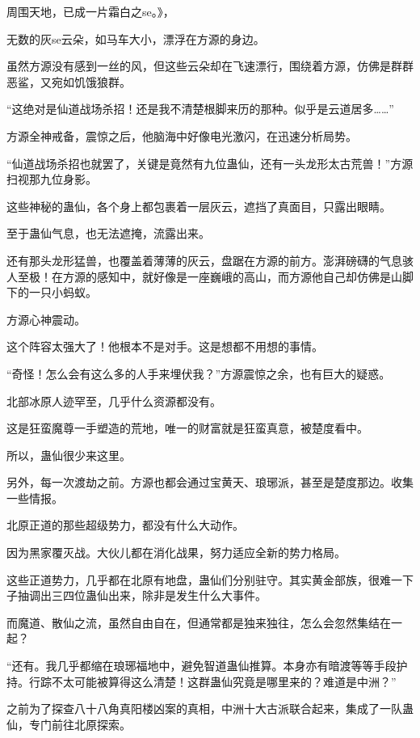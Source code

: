 
\begin{this_body}

周围天地，已成一片霜白之se。》，

无数的灰se云朵，如马车大小，漂浮在方源的身边。

虽然方源没有感到一丝的风，但这些云朵却在飞速漂行，围绕着方源，仿佛是群群恶鲨，又宛如饥饿狼群。

“这绝对是仙道战场杀招！还是我不清楚根脚来历的那种。似乎是云道居多……”

方源全神戒备，震惊之后，他脑海中好像电光激闪，在迅速分析局势。

“仙道战场杀招也就罢了，关键是竟然有九位蛊仙，还有一头龙形太古荒兽！”方源扫视那九位身影。

这些神秘的蛊仙，各个身上都包裹着一层灰云，遮挡了真面目，只露出眼睛。

至于蛊仙气息，也无法遮掩，流露出来。

还有那头龙形猛兽，也覆盖着薄薄的灰云，盘踞在方源的前方。澎湃磅礴的气息骇人至极！在方源的感知中，就好像是一座巍峨的高山，而方源他自己却仿佛是山脚下的一只小蚂蚁。

方源心神震动。

这个阵容太强大了！他根本不是对手。这是想都不用想的事情。

“奇怪！怎么会有这么多的人手来埋伏我？”方源震惊之余，也有巨大的疑惑。

北部冰原人迹罕至，几乎什么资源都没有。

这是狂蛮魔尊一手塑造的荒地，唯一的财富就是狂蛮真意，被楚度看中。

所以，蛊仙很少来这里。

另外，每一次渡劫之前。方源也都会通过宝黄天、琅琊派，甚至是楚度那边。收集一些情报。

北原正道的那些超级势力，都没有什么大动作。

因为黑家覆灭战。大伙儿都在消化战果，努力适应全新的势力格局。

这些正道势力，几乎都在北原有地盘，蛊仙们分别驻守。其实黄金部族，很难一下子抽调出三四位蛊仙出来，除非是发生什么大事件。

而魔道、散仙之流，虽然自由自在，但通常都是独来独往，怎么会忽然集结在一起？

“还有。我几乎都缩在琅琊福地中，避免智道蛊仙推算。本身亦有暗渡等等手段护持。行踪不太可能被算得这么清楚！这群蛊仙究竟是哪里来的？难道是中洲？”

之前为了探查八十八角真阳楼凶案的真相，中洲十大古派联合起来，集成了一队蛊仙，专门前往北原探索。


\end{this_body}
